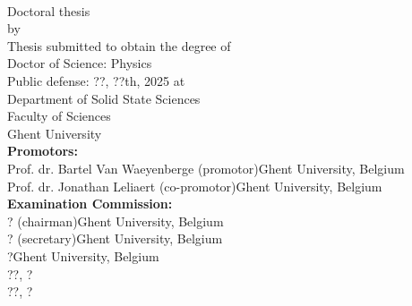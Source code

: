 \thispagestyle{empty}
\noindent

\fontsize{12pt}{14pt}\selectfont

\vspace*{-3cm}
\noindent{}
\vspace{2cm}
\fontsize{22pt}{22pt}\selectfont
\begin{center}
{\textsc{\phdtitle}}\\
\end{center}

\fontsize{14pt}{16pt}\selectfont

\null\hfill Doctoral thesis\\
\null\hfill by \phdauthor\\
\vfill
{}
\fontsize{12pt}{14pt}\selectfont
Thesis submitted to obtain the degree of\\
Doctor of Science: Physics\\
\newline
Public defense: ??, ??th, 2025 at \\ %
Department of Solid State Sciences\\
Faculty of Sciences\\
Ghent University\\


\textbf{Promotors:}\\
Prof. dr. Bartel Van Waeyenberge (promotor)\hfill Ghent University, Belgium\\
Prof. dr. Jonathan Leliaert (co-promotor)\hfill Ghent University, Belgium\\
\newline
\textbf{Examination Commission:}\\
? (chairman)\hfill Ghent University, Belgium\\ %
? (secretary)\hfill Ghent University, Belgium\\
?\hfill Ghent University, Belgium\\
?\hfill ?, ?\\
?\hfill ?, ?\\


\newpage
